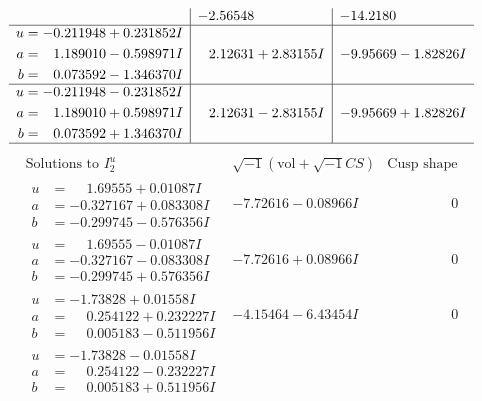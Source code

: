 \documentclass[1p]{elsarticle_modified}
\theoremstyle{definition}
\newcommand{\I}{\sqrt{-1}}
\begin{document}
$$\begin{array}{c|c|c}
 & -2.56548\phantom{ +0.000000I} & -14.2180\phantom{ +0.000000I} \\ \hline\begin{aligned}
u &= -0.211948 + 0.231852 I \\
a &= \phantom{-}1.189010 - 0.598971 I \\
b &= \phantom{-}0.073592 - 1.346370 I\end{aligned}
 & \phantom{-}2.12631 + 2.83155 I & -9.95669 - 1.82826 I \\ \hline\begin{aligned}
u &= -0.211948 - 0.231852 I \\
a &= \phantom{-}1.189010 + 0.598971 I \\
b &= \phantom{-}0.073592 + 1.346370 I\end{aligned}
 & \phantom{-}2.12631 - 2.83155 I & -9.95669 + 1.82826 I\\
 \hline 
 \end{array}$$\newpage$$\begin{array}{c|c|c}  
\text{Solutions to }I^u_{2}& \I (\text{vol} + \sqrt{-1}CS) & \text{Cusp shape}\\
 \hline 
\begin{aligned}
u &= \phantom{-}1.69555 + 0.01087 I \\
a &= -0.327167 + 0.083308 I \\
b &= -0.299745 - 0.576356 I\end{aligned}
 & -7.72616 - 0.08966 I & \phantom{-0.000000 } 0 \\ \hline\begin{aligned}
u &= \phantom{-}1.69555 - 0.01087 I \\
a &= -0.327167 - 0.083308 I \\
b &= -0.299745 + 0.576356 I\end{aligned}
 & -7.72616 + 0.08966 I & \phantom{-0.000000 } 0 \\ \hline\begin{aligned}
u &= -1.73828 + 0.01558 I \\
a &= \phantom{-}0.254122 + 0.232227 I \\
b &= \phantom{-}0.005183 - 0.511956 I\end{aligned}
 & -4.15464 - 6.43454 I & \phantom{-0.000000 } 0 \\ \hline\begin{aligned}
u &= -1.73828 - 0.01558 I \\
a &= \phantom{-}0.254122 - 0.232227 I \\
b &= \phantom{-}0.005183 + 0.511956 I\end{aligned}

\end{array}$$
\end{document}
